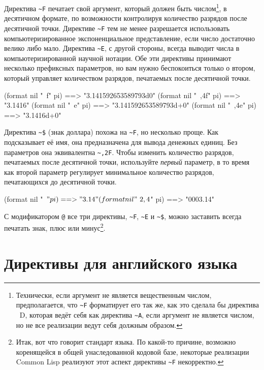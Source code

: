 Директива \lstinline!~F! печатает свой аргумент, который должен быть
числом\footnote{Технически, если аргумент не является вещественным числом, предполагается,
  что \lstinline!~F! форматирует его так же, как это сделала бы директива ~D, которая
  ведёт себя как директива \lstinline!~A!, если аргумент не является числом, но не все
  реализации ведут себя должным образом.}\hspace{\footnotenegspace}, в десятичном формате, по возможности
контролируя количество разрядов после десятичной точки. Директиве \lstinline!~F! тем не
менее разрешается использовать компьютеризированное экспоненциальное представление, если
число достаточно велико либо мало. Директива \lstinline!~E!, с другой стороны, всегда
выводит числа в компьютеризированной научной нотации. Обе эти директивы принимают
несколько префиксных параметров, но вам нужно беспокоиться только о втором, который
управляет количеством разрядов, печатаемых после десятичной точки.

\begin{myverb}
(format nil "~f" pi)   ==> "3.141592653589793d0"
(format nil "~,4f" pi) ==> "3.1416"
(format nil "~e" pi)   ==> "3.141592653589793d+0"
(format nil "~,4e" pi) ==> "3.1416d+0"
\end{myverb}

Директива \lstinline!~$! (знак доллара) похожа на \lstinline!~F!, но несколько
проще. Как подсказывает её имя, она предназначена для вывода денежных единиц. Без
параметров она эквивалентна \lstinline!~,2F!. Чтобы изменить количество разрядов,
печатаемых после десятичной точки, используйте \textit{первый} параметр, в то время как
второй параметр регулирует минимальное количество разрядов, печатающихся до десятичной
точки.%

\begin{myverb}
(format nil "~$" pi) ==> "3.14"
(format nil "~2,4$" pi) ==> "0003.14"
\end{myverb}

С модификатором \lstinline!@! все три директивы, \lstinline!~F!, \lstinline!~E! и
\lstinline!~$!, можно заставить всегда печатать знак, плюс или минус\footnote{Итак, вот
  что говорит стандарт языка. По какой-то причине, возможно коренящейся в общей
  унаследованной кодовой базе, некоторые реализации Common Lisp реализуют этот аспект
  директивы \lstinline!~F! некорректно.}\hspace{\footnotenegspace}. %

\section{Директивы для английского языка}
\label{ch18:eng-lang}


